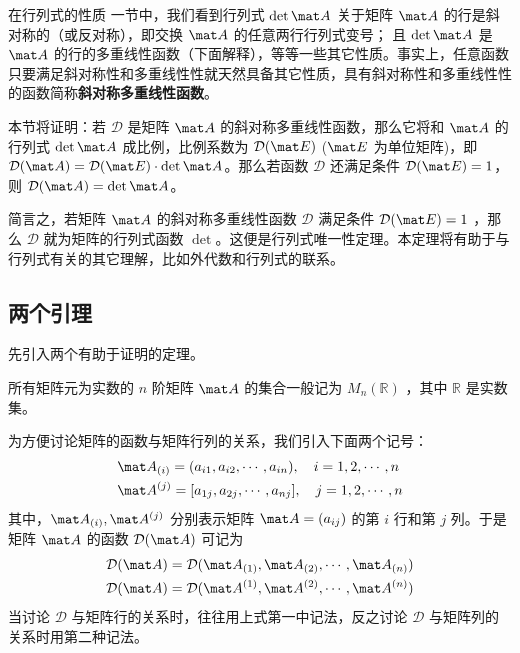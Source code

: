 
在行列式的性质 一节中，我们看到行列式 $\det \mat A$ 关于矩阵 $\mat A$ 的行是斜对称的（或反对称），即交换 $\mat A$ 的任意两行行列式变号； 且 $\det \mat A$ 是 $\mat A$ 的行的多重线性函数（下面解释），等等一些其它性质。事实上，任意函数只要满足斜对称性和多重线性性就天然具备其它性质，具有斜对称性和多重线性性的函数简称\textbf{斜对称多重线性函数}。

本节将证明：若 $\mathcal D$ 是矩阵 $\mat A$ 的斜对称多重线性函数，那么它将和 $\mat A$ 的行列式 $\det \mat A$ 成比例，比例系数为 $\mathcal D(\mat E)$ ($\mat E$ 为单位矩阵)，即 $\mathcal D(\mat A)=\mathcal D(\mat E)\cdot \det \mat A$。那么若函数 $\mathcal D$ 还满足条件 $\mathcal D(\mat E)=1$，则 $\mathcal D(\mat A)=\det\mat A$。

简言之，若矩阵 $\mat A$ 的斜对称多重线性函数 $\mathcal D$ 满足条件 $\mathcal D(\mat E)=1$ ，那么 $\mathcal D$ 就为矩阵的行列式函数 $\det$。这便是行列式唯一性定理。本定理将有助于与行列式有关的其它理解，比如外代数和行列式的联系。

\subsection{两个引理}

先引入两个有助于证明的定理。

所有矩阵元为实数的 $n$ 阶矩阵 $\mat A$ 的集合一般记为 $M_n(\mathbb R)$ ，其中 $\mathbb R$ 是实数集。

为方便讨论矩阵的函数与矩阵行列的关系，我们引入下面两个记号：
\begin{equation}
\begin{aligned}
&\mat A_{(i)}=(a_{i1},a_{i2},\cdots,a_{in}),\quad i=1,2,\cdots, n\\
&\mat A^{(j)}=[a_{1j},a_{2j},\cdots,a_{nj}],\quad j=1,2,\cdots, n
\end{aligned}
\end{equation}
其中，$\mat A_{(i)},\mat A^{(j)}$ 分别表示矩阵 $\mat A=(a_{ij})$ 的第 $i$ 行和第 $j$ 列。于是矩阵 $\mat A$ 的函数 $\mathcal D(\mat A)$ 可记为 
\begin{equation}
\begin{aligned}
&\mathcal D(\mat A)=\mathcal D(\mat A_{(1)},\mat A_{(2)},\cdots,\mat A_{(n)})\\
&\mathcal D(\mat A)=\mathcal D(\mat A^{(1)},\mat A^{(2)},\cdots,\mat A^{(n)})\\
\end{aligned}
\end{equation}
当讨论 $\mathcal D$ 与矩阵行的关系时，往往用上式第一中记法，反之讨论 $\mathcal D$ 与矩阵列的关系时用第二种记法。

